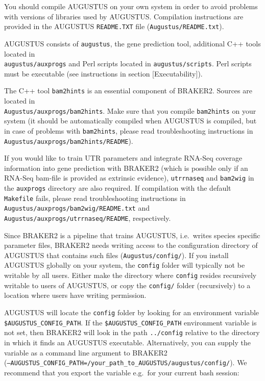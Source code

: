 \documentclass[]{article}
\begin{document}
You should compile AUGUSTUS on your own system in order to avoid
problems with versions of libraries used by AUGUSTUS. Compilation
instructions are provided in the AUGUSTUS \texttt{README.TXT} file
(\texttt{Augustus/README.txt}).

AUGUSTUS consists of \texttt{augustus}, the gene prediction tool,
additional C++ tools located in\\
\texttt{augustus/auxprogs} and Perl scripts located in
\texttt{augustus/scripts}. Perl scripts must be executable (see
instructions in section {[}Executability{]}).

The C++ tool \texttt{bam2hints} is an essential component of BRAKER2.
Sources are located in\\
\texttt{Augustus/auxprogs/bam2hints}. Make sure that you compile
\texttt{bam2hints} on your system (it should be automatically compiled
when AUGUSTUS is compiled, but in case of problems with
\texttt{bam2hints}, please read troubleshooting instructions in
\texttt{Augustus/auxprogs/bam2hints/README}).

If you would like to train UTR parameters and integrate RNA-Seq coverage
information into gene prediction with BRAKER2 (which is possible only if
an RNA-Seq bam-file is provided as extrinsic evidence),
\texttt{utrrnaseq} and \texttt{bam2wig} in the \texttt{auxprogs}
directory are also required. If compilation with the default
\texttt{Makefile} fails, please read troubleshooting instructions in
\texttt{Augustus/auxprogs/bam2wig/README.txt} and
\texttt{Augustus/auxprogs/utrrnaseq/README}, respectively.

Since BRAKER2 is a pipeline that trains AUGUSTUS, i.e.~writes species
specific parameter files, BRAKER2 needs writing access to the
configuration directory of AUGUSTUS that contains such files
(\texttt{Augustus/config/}). If you install AUGUSTUS globally on your
system, the \texttt{config} folder will typically not be writable by all
users. Either make the directory where \texttt{config} resides
recursively writable to users of AUGUSTUS, or copy the \texttt{config/}
folder (recursively) to a location where users have writing permission.

AUGUSTUS will locate the \texttt{config} folder by looking for an
environment variable \texttt{\$AUGUSTUS\_CONFIG\_PATH}. If the
\texttt{\$AUGUSTUS\_CONFIG\_PATH} environment variable is not set, then
BRAKER2 will look in the path \texttt{../config} relative to the
directory in which it finds an AUGUSTUS executable. Alternatively, you
can supply the variable as a command line argument to BRAKER2\\
(\texttt{–AUGUSTUS\_CONFIG\_PATH=/your\_path\_to\_AUGUSTUS/augustus/config/}).
We recommend that you export the variable e.g.~for your current bash
session:
\end{document}
